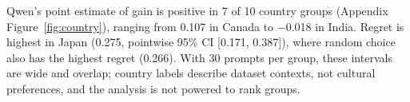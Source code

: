Qwen's point estimate of gain is positive in 7 of 10 country groups (Appendix Figure~\ref{fig:country}), ranging from 0.107 in Canada to $-$0.018 in India. Regret is highest in Japan (0.275, pointwise 95\% CI [0.171, 0.387]), where random choice also has the highest regret (0.266). With 30 prompts per group, these intervals are wide and overlap; country labels describe dataset contexts, not cultural preferences, and the analysis is not powered to rank groups.
